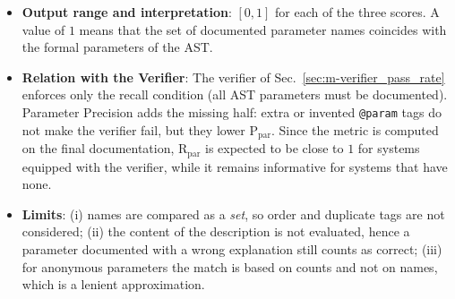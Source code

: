 \begin{itemize}[leftmargin=*, label=\textbullet]
	\item \textbf{Output range and interpretation}: $[0,1]$ for each of the three scores. A value of
	$1$ means that the set of documented parameter names coincides with the formal parameters of the
	AST.
	
	\item \textbf{Relation with the Verifier}: The verifier of Sec.~\ref{sec:m-verifier_pass_rate}
	enforces only the recall condition (all AST parameters must be documented). Parameter Precision
	adds the missing half: extra or invented \texttt{@param} tags do not make the verifier fail, but
	they lower $\mathrm{P}_{\mathrm{par}}$. Since the metric is computed on the final documentation,
	$\mathrm{R}_{\mathrm{par}}$ is expected to be close to $1$ for systems equipped with the
	verifier, while it remains informative for systems that have none.
	
	\item \textbf{Limits}: (i) names are compared as a \emph{set}, so order and duplicate tags are not
	considered; (ii) the content of the description is not evaluated, hence a parameter documented
	with a wrong explanation still counts as correct; (iii) for anonymous parameters the match is
	based on counts and not on names, which is a lenient approximation.
\end{itemize}

